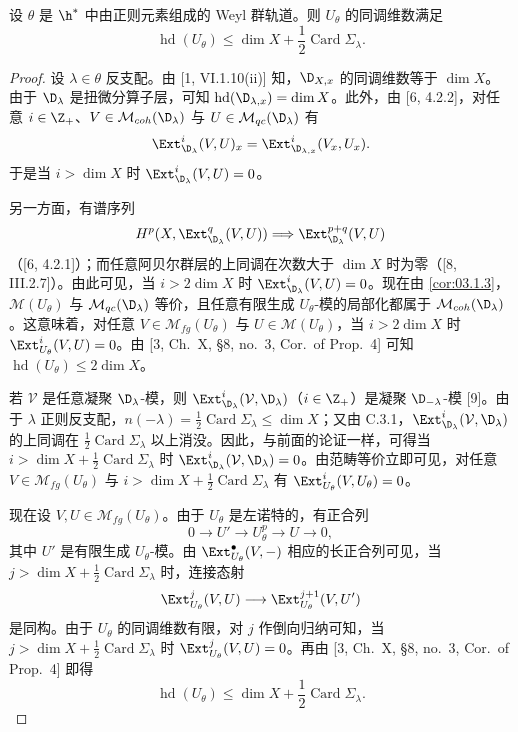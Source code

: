 \begin{theorem}\label{thm:03.1.4}
设 $\theta$ 是 $\h^*$ 中由正则元素组成的 Weyl 群轨道。则 $U_\theta$ 的同调维数满足
$$\operatorname{hd}(U_\theta)\le\dim X+\frac{1}{2}\operatorname{Card}\Sigma_\lambda.$$
\end{theorem}

\begin{proof}
设 $\lambda\in\theta$ 反支配。由 [1, VI.1.10(ii)] 知，$\D_{X,x}$ 的同调维数等于 $\dim X$。由于 $\D_\lambda$ 是扭微分算子层，可知 $\operatorname{hd}(\D_{\lambda,x})=\dim X$。此外，由 [6, 4.2.2]，对任意 $i\in\Z_+$、$V\in\mathcal{M}_{coh}(\D_\lambda)$ 与 $U\in\mathcal{M}_{qc}(\D_\lambda)$ 有
$$\Ext^i_{\D_\lambda}(V,U)_x=\Ext^i_{\D_{\lambda,x}}(V_x,U_x).$$
于是当 $i>\dim X$ 时 $\Ext^i_{\D_\lambda}(V,U)=0$。

另一方面，有谱序列
$$H^p(X,\Ext^q_{\D_\lambda}(V,U))\Longrightarrow\Ext^{p+q}_{\D_\lambda}(V,U)$$
（[6, 4.2.1]）；而任意阿贝尔群层的上同调在次数大于 $\dim X$ 时为零（[8, III.2.7]）。由此可见，当 $i>2\dim X$ 时 $\Ext^i_{\D_\lambda}(V,U)=0$。现在由 \ref{cor:03.1.3}，$\mathcal{M}(U_\theta)$ 与 $\mathcal{M}_{qc}(\D_\lambda)$ 等价，且任意有限生成 $U_\theta$-模的局部化都属于 $\mathcal{M}_{coh}(\D_\lambda)$。这意味着，对任意 $V\in\mathcal{M}_{fg}(U_\theta)$ 与 $U\in\mathcal{M}(U_\theta)$，当 $i>2\dim X$ 时 $\Ext^i_{U_\theta}(V,U)=0$。由 [3, Ch.~X, \S8, no.~3, Cor.~of Prop.~4] 可知 $\operatorname{hd}(U_\theta)\le 2\dim X$。

若 $\mathcal{V}$ 是任意凝聚 $\D_\lambda$-模，则 $\Ext^i_{\D_\lambda}(\mathcal{V},\D_\lambda)$（$i\in\Z_+$）是凝聚 $\D_{-\lambda}$-模 [9]。由于 $\lambda$ 正则反支配，$n(-\lambda)=\frac{1}{2}\operatorname{Card}\Sigma_\lambda\le\dim X$；又由 C.3.1，$\Ext^i_{\D_\lambda}(\mathcal{V},\D_\lambda)$ 的上同调在 $\frac{1}{2}\operatorname{Card}\Sigma_\lambda$ 以上消没。因此，与前面的论证一样，可得当 $i>\dim X+\frac{1}{2}\operatorname{Card}\Sigma_\lambda$ 时 $\Ext^i_{\D_\lambda}(\mathcal{V},\D_\lambda)=0$。由范畴等价立即可见，对任意 $V\in\mathcal{M}_{fg}(U_\theta)$ 与 $i>\dim X+\frac{1}{2}\operatorname{Card}\Sigma_\lambda$ 有 $\Ext^i_{U_\theta}(V,U_\theta)=0$。

现在设 $V,U\in\mathcal{M}_{fg}(U_\theta)$。由于 $U_\theta$ 是左诺特的，有正合列
$$0\longrightarrow U'\longrightarrow U_\theta^p\longrightarrow U\longrightarrow 0,$$
其中 $U'$ 是有限生成 $U_\theta$-模。由 $\Ext^\bullet_{U_\theta}(V,-)$ 相应的长正合列可见，当 $j>\dim X+\frac{1}{2}\operatorname{Card}\Sigma_\lambda$ 时，连接态射
$$\Ext^j_{U_\theta}(V,U)\longrightarrow\Ext^{j+1}_{U_\theta}(V,U')$$
是同构。由于 $U_\theta$ 的同调维数有限，对 $j$ 作倒向归纳可知，当 $j>\dim X+\frac{1}{2}\operatorname{Card}\Sigma_\lambda$ 时 $\Ext^j_{U_\theta}(V,U)=0$。再由 [3, Ch.~X, \S8, no.~3, Cor.~of Prop.~4] 即得
$$\operatorname{hd}(U_\theta)\le\dim X+\frac{1}{2}\operatorname{Card}\Sigma_\lambda.$$
\end{proof}

